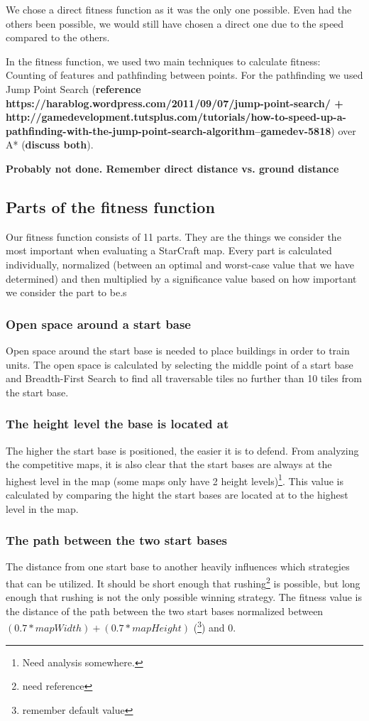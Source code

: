 We chose a direct fitness function as it was the only one possible. Even had the others been possible, we would still have chosen a direct one due to the speed compared to the others. 

In the fitness function, we used two main techniques to calculate fitness: Counting of features and pathfinding between points. For the pathfinding we used Jump Point Search (\textbf{reference https://harablog.wordpress.com/2011/09/07/jump-point-search/ + http://gamedevelopment.tutsplus.com/tutorials/how-to-speed-up-a-pathfinding-with-the-jump-point-search-algorithm--gamedev-5818}) over A* (\textbf{discuss both}).

\textbf{Probably not done. Remember direct distance vs. ground distance}

\subsection{Parts of the fitness function}

Our fitness function consists of 11 parts. They are the things we consider the most important when evaluating a StarCraft map. Every part is calculated individually, normalized (between an optimal and worst-case value that we have determined) and then multiplied by a significance value based on how important we consider the part to be.s

\subsubsection*{Open space around a start base}
Open space around the start base is needed to place buildings in order to train units. The open space is calculated by selecting the middle point of a start base and Breadth-First Search to find all traversable tiles no further than 10 tiles from the start base.

\subsubsection*{The height level the base is located at}
The higher the start base is positioned, the easier it is to defend. From analyzing the competitive maps, it is also clear that the start bases are always at the highest level in the map (some maps only have 2 height levels)\footnote{Need analysis somewhere.}. This value is calculated by comparing the hight the start bases are located at to the highest level in the map. 

\subsubsection*{The path between the two start bases}
The distance from one start base to another heavily influences which strategies that can be utilized. It should be short enough that rushing\footnote{need reference} is possible, but long enough that rushing is not the only possible winning strategy. The fitness value is the distance of the path between the two start bases normalized between $(0.7 * mapWidth) + (0.7 * mapHeight)$ (\footnote{remember default value}) and 0.


